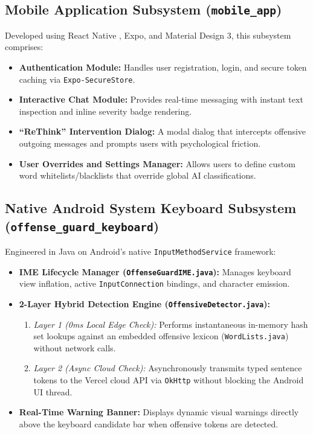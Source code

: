 \documentclass[A4paper,12pt]{report}
\theoremstyle{plain}
\theoremstyle{definition}
\theoremstyle{remark}
\numberwithin{equation}{section}
\begin{document}
\subsection{Mobile Application Subsystem (\texttt{mobile\_app})}
Developed using React Native \cite{ref6}, Expo, and Material Design 3, this subsystem comprises:
\begin{itemize}[leftmargin=*]
    \item \textbf{Authentication Module:} Handles user registration, login, and secure token caching via \texttt{Expo-SecureStore}.
    \item \textbf{Interactive Chat Module:} Provides real-time messaging with instant text inspection and inline severity badge rendering.
    \item \textbf{``ReThink'' Intervention Dialog:} A modal dialog that intercepts offensive outgoing messages and prompts users with psychological friction.
    \item \textbf{User Overrides and Settings Manager:} Allows users to define custom word whitelists/blacklists that override global AI classifications.
\end{itemize}

\subsection{Native Android System Keyboard Subsystem (\texttt{offense\_guard\_keyboard})}
Engineered in Java on Android's native \texttt{InputMethodService} \cite{ref15} framework:
\begin{itemize}[leftmargin=*]
    \item \textbf{IME Lifecycle Manager (\texttt{OffenseGuardIME.java}):} Manages keyboard view inflation, active \texttt{InputConnection} bindings, and character emission.
    \item \textbf{2-Layer Hybrid Detection Engine (\texttt{OffensiveDetector.java}):} 
    \begin{enumerate}
        \item \textit{Layer 1 (0ms Local Edge Check):} Performs instantaneous in-memory hash set lookups against an embedded offensive lexicon (\texttt{WordLists.java}) without network calls.
        \item \textit{Layer 2 (Async Cloud Check):} Asynchronously transmits typed sentence tokens to the Vercel cloud API via \texttt{OkHttp} without blocking the Android UI thread.
    \end{enumerate}
    \item \textbf{Real-Time Warning Banner:} Displays dynamic visual warnings directly above the keyboard candidate bar when offensive tokens are detected.
\end{itemize}
\end{document}
